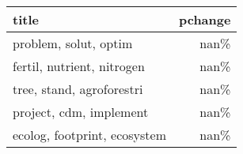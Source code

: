 \begin{tabular}{p{1.2cm}r}
\toprule
                        title &  pchange \\
\midrule
        problem, solut, optim &     nan\% \\
   fertil, nutrient, nitrogen &     nan\% \\
    tree, stand, agroforestri &     nan\% \\
      project, cdm, implement &     nan\% \\
 ecolog, footprint, ecosystem &     nan\% \\
\bottomrule
\end{tabular}
